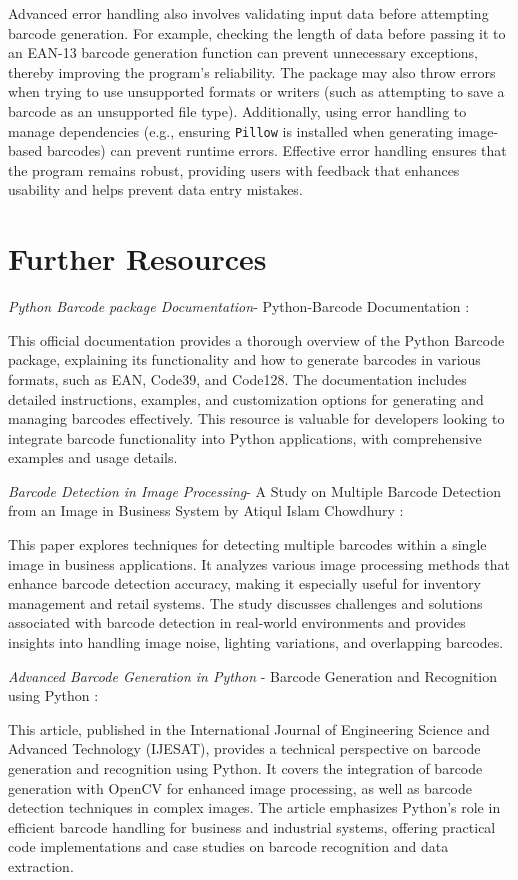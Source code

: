 Advanced error handling also involves validating input data before attempting barcode generation. For example, checking the length of data before passing it to an EAN-13 barcode generation function can prevent unnecessary exceptions, thereby improving the program's reliability. The package may also throw errors when trying to use unsupported formats or writers (such as attempting to save a barcode as an unsupported file type). Additionally, using error handling to manage dependencies (e.g., ensuring \texttt{Pillow} is installed when generating image-based barcodes) can prevent runtime errors. Effective error handling ensures that the program remains robust, providing users with feedback that enhances usability and helps prevent data entry mistakes. \cite{hichembarcode:2023}

\section{Further Resources}

\textit{Python Barcode package Documentation}- Python-Barcode Documentation \cite{Pythonbarcodepackage:2024}:

This official documentation provides a thorough overview of the Python Barcode package, explaining its functionality and how to generate barcodes in various formats, such as EAN, Code39, and Code128. The documentation includes detailed instructions, examples, and customization options for generating and managing barcodes effectively. This resource is valuable for developers looking to integrate barcode functionality into Python applications, with comprehensive examples and usage details.


\textit{Barcode Detection in Image Processing}- A Study on Multiple Barcode Detection from an Image in Business System by Atiqul Islam Chowdhury \cite{Chowdhury:2019}:

This paper explores techniques for detecting multiple barcodes within a single image in business applications. It analyzes various image processing methods that enhance barcode detection accuracy, making it especially useful for inventory management and retail systems. The study discusses challenges and solutions associated with barcode detection in real-world environments and provides insights into handling image noise, lighting variations, and overlapping barcodes.

\textit{Advanced Barcode Generation in Python} - Barcode Generation and Recognition using Python \cite{Ijesat:2023}:

This article, published in the International Journal of Engineering Science and Advanced Technology (IJESAT), provides a technical perspective on barcode generation and recognition using Python. It covers the integration of barcode generation with OpenCV for enhanced image processing, as well as barcode detection techniques in complex images. The article emphasizes Python’s role in efficient barcode handling for business and industrial systems, offering practical code implementations and case studies on barcode recognition and data extraction.
